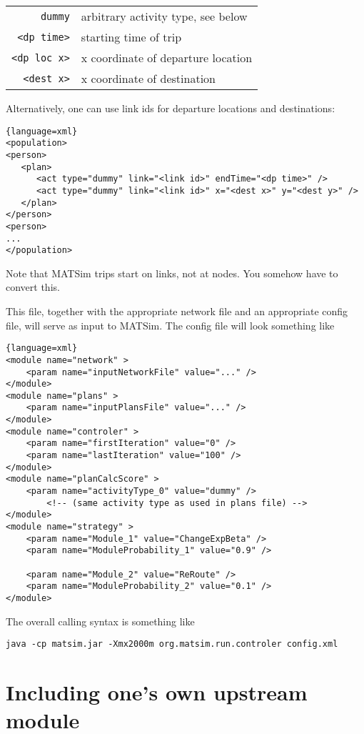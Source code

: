 \begin{tabularx}{\hsize}{rX}
\verb$dummy$ & arbitrary activity type, see below \\
\verb$<dp time>$ & starting time of trip \\
\verb$<dp loc x>$ & x coordinate of departure location \\
\verb$<dest x>$ & x coordinate of destination \\
\end{tabularx}

Alternatively, one can use link ids for departure locations and destinations:
\begin{lstlisting}{language=xml}
<population>
<person>
   <plan>
      <act type="dummy" link="<link id>" endTime="<dp time>" />
      <act type="dummy" link="<link id>" x="<dest x>" y="<dest y>" />
   </plan>
</person>
<person>
...
</population>
\end{lstlisting}

Note that MATSim trips start on links, not at nodes.  You somehow have to convert this.

This file, together with the appropriate network file and an appropriate config file, will serve as input to MATSim.  The config file will look something like
\begin{lstlisting}{language=xml}
<module name="network" >
	<param name="inputNetworkFile" value="..." /> 
</module>
<module name="plans" >
	<param name="inputPlansFile" value="..." />
</module>
<module name="controler" >
	<param name="firstIteration" value="0" />
	<param name="lastIteration" value="100" />
</module>
<module name="planCalcScore" >
	<param name="activityType_0" value="dummy" />
        <!-- (same activity type as used in plans file) -->
</module>
<module name="strategy" >
	<param name="Module_1" value="ChangeExpBeta" />
	<param name="ModuleProbability_1" value="0.9" />

	<param name="Module_2" value="ReRoute" />
	<param name="ModuleProbability_2" value="0.1" />
</module>
\end{lstlisting}

The overall calling syntax is something like
\begin{lstlisting}
java -cp matsim.jar -Xmx2000m org.matsim.run.controler config.xml 
\end{lstlisting}

\section{Including one's own upstream module}
\label{sec:including-ones-own}

